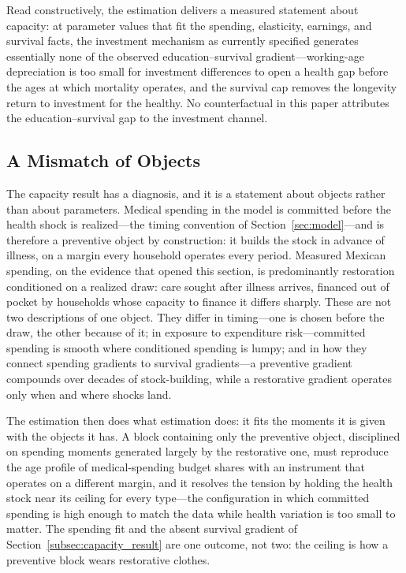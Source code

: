 \documentclass[12pt,a4paper]{article}
\begin{document}
Read constructively, the estimation delivers a measured statement about capacity: at parameter values that fit the spending, elasticity, earnings, and survival facts, the investment mechanism as currently specified generates essentially none of the observed education--survival gradient---working-age depreciation is too small for investment differences to open a health gap before the ages at which mortality operates, and the survival cap removes the longevity return to investment for the healthy. No counterfactual in this paper attributes the education--survival gap to the investment channel.

\subsection{A Mismatch of Objects}
\label{subsec:diagnosis}

The capacity result has a diagnosis, and it is a statement about objects rather than about parameters. Medical spending in the model is committed before the health shock is realized---the timing convention of Section~\ref{sec:model}---and is therefore a preventive object by construction: it builds the stock in advance of illness, on a margin every household operates every period. Measured Mexican spending, on the evidence that opened this section, is predominantly restoration conditioned on a realized draw: care sought after illness arrives, financed out of pocket by households whose capacity to finance it differs sharply. These are not two descriptions of one object. They differ in timing---one is chosen before the draw, the other because of it; in exposure to expenditure risk---committed spending is smooth where conditioned spending is lumpy; and in how they connect spending gradients to survival gradients---a preventive gradient compounds over decades of stock-building, while a restorative gradient operates only when and where shocks land.

The estimation then does what estimation does: it fits the moments it is given with the objects it has. A block containing only the preventive object, disciplined on spending moments generated largely by the restorative one, must reproduce the age profile of medical-spending budget shares with an instrument that operates on a different margin, and it resolves the tension by holding the health stock near its ceiling for every type---the configuration in which committed spending is high enough to match the data while health variation is too small to matter. The spending fit and the absent survival gradient of Section~\ref{subsec:capacity_result} are one outcome, not two: the ceiling is how a preventive block wears restorative clothes.
\end{document}
